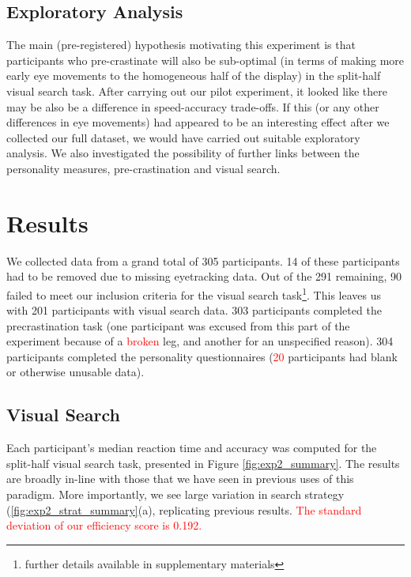 \documentclass[]{rsos}
\begin{document}
\subsection{Exploratory Analysis}

The main (pre-registered) hypothesis motivating this experiment is that participants who pre-crastinate will also be sub-optimal (in terms of making more early eye movements to the homogeneous half of the display) in the split-half visual search task. After carrying out our pilot experiment, it looked like there may be also be a difference in speed-accuracy trade-offs. If this (or any other differences in eye movements) had appeared to be an interesting effect after we collected our full dataset, we would have carried out suitable exploratory analysis. We also investigated the possibility of further links between the personality measures, pre-crastination and visual search. 

\section{Results}

We collected data from a grand total of 305 participants. 14 of these participants had to be removed due to missing eyetracking data. Out of the 291 remaining, 90 failed to meet our inclusion criteria for the visual search task\footnote{further details available in supplementary materials}. This leaves us with 201 participants with visual search data. 303 participants completed the precrastination task (one participant was excused from this part of the experiment because of a \textcolor{red}{broken} leg, and another for an unspecified reason). 304 participants completed the personality questionnaires (\textcolor{red}{20} participants had blank or otherwise unusable data).

\subsection{Visual Search}

Each participant’s median reaction time and accuracy was computed for the split-half visual
search task, presented in Figure \ref{fig:exp2_summary}. The results are broadly in-line with those that we have seen in previous uses of this paradigm. More importantly, we see large variation in search strategy (\ref{fig:exp2_strat_summary}(a), replicating previous results. \textcolor{red}{The standard deviation of our efficiency score is 0.192.} 
\end{document}
